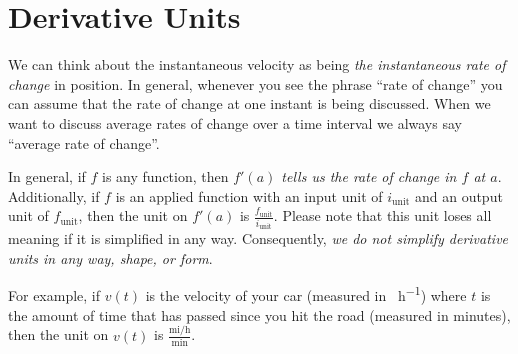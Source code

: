 \documentclass[12pt,]{book}
\theoremstyle{plain}
\theoremstyle{definition}
\numberwithin{equation}{section}
\newcommand{\fe}[2]{#1\mathopen{}\left(#2\right)\mathclose{}}
\newcommand{\fd}[1]{#1'}
\begin{document}
\section[Derivative Units]{Derivative Units}\label{section-derivative-units}
We can think about the instantaneous velocity as being \emph{the instantaneous rate of change} in position. In general, whenever you see the phrase ``rate of change'' you can assume that the rate of change at one instant is being discussed. When we want to discuss average rates of change over a time interval we always say ``average rate of change''.%
\par
In general, if \(f\) is any function, then \emph{\(\fe{\fd{f}}{a}\) tells us the rate of change in \(f\) at \(a\)}. Additionally, if \(f\) is an applied function with an input unit of \(i_{\text{unit}}\) and an output unit of \(f_{\text{unit}}\), then the unit on \(\fe{\fd{f}}{a}\) is \(\frac{f_{\text{unit}}}{i_{\text{unit}}}\). Please note that this unit loses all meaning if it is simplified in any way. Consequently, \emph{we do not simplify derivative units in any way, shape, or form}.%
\par
For example, if \(\fe{v}{t}\) is the velocity of your car (measured in \si{\mile\per\hour}) where \(t\) is the amount of time that has passed since you hit the road (measured in minutes), then the unit on \(\fe{v}{t}\) is \(\frac{\text{mi}/\text{h}}{\text{min}}\).%
\typeout{************************************************}
\typeout{************************************************}
\end{document}
